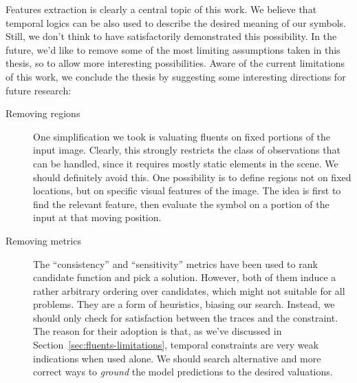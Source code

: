 Features extraction is clearly a central topic of this work. We believe that
temporal logics can be also used to describe the desired meaning of our
symbols. Still, we don't think to have satisfactorily demonstrated this
possibility. In the future, we'd like to remove some of the most limiting
assumptions taken in this thesis, so to allow more interesting possibilities.
Aware of the current limitations of this work, we conclude the thesis by
suggesting some interesting directions for future research:
\begin{description}
	\item [Removing regions]
		One simplification we took is valuating fluents on fixed portions of the
		input image. Clearly, this strongly restricts the class of observations
		that can be handled, since it requires mostly static elements in the
		scene.  We should definitely avoid this. One possibility is to define
		regions not on fixed locations, but on specific visual features of the
		image. The idea is first to find the relevant feature, then evaluate the
		symbol on a portion of the input at that moving position.

	\item [Removing metrics]
		The ``consistency'' and ``sensitivity'' metrics have been used to rank
		candidate function and pick a solution. However, both of them induce a
		rather arbitrary ordering over candidates, which might not suitable for
		all problems. They are a form of heuristics, biasing our search. Instead,
		we should only check for satisfaction between the traces and the
		constraint.  The reason for their adoption is that, as we've discussed in
		Section~\ref{sec:fluents-limitations}, temporal constraints are very weak
		indications when used alone. We should search alternative and more correct
		ways to \emph{ground} the model predictions to the desired valuations.


\end{description}
